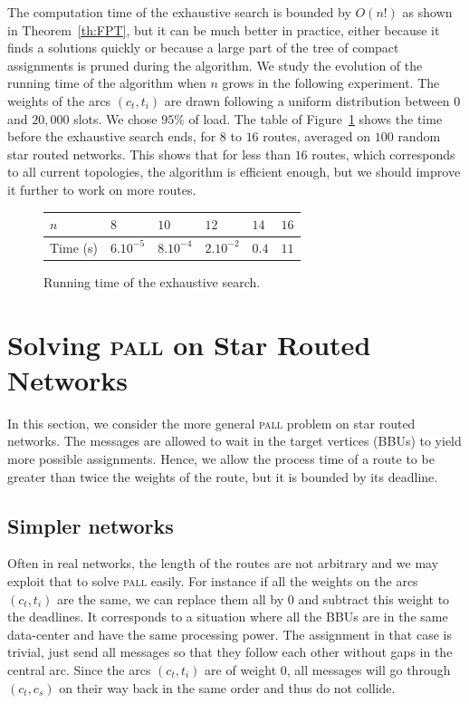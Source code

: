 \documentclass[a4paper,10pt]{article}
\newcommand\pall{\textsc{pall}\xspace}
\begin{document}
      The computation time of the exhaustive search is bounded by $O(n!)$ as shown in Theorem~\ref{th:FPT}, 
      but it can be much better in practice, either because it finds a solutions quickly or because a large part of the tree of 
      compact assignments is pruned during the algorithm. We study the evolution of the running time  of the algorithm when $n$ grows in the following experiment. The weights of the arcs $(c_t,t_i)$ are drawn following a uniform distribution between $0$ and $20,000$ slots. We chose  $95\%$ of load.  The table of Figure~\ref{fig:table} shows the time before the exhaustive search ends, for $8$ to $16$ routes, averaged on $100$ random star routed networks. This shows that for less than $16$ routes, which corresponds to all current topologies, the algorithm is efficient enough, but we should improve it further to work on more routes.
      
      \begin{figure}[h]
         \begin{center}
         \begin{tabularx}{0.5\textwidth}{|l|X|X|X|X|X|}
    \hline
   $n$ & $8$ & $10$& $12$&$14$& $16$\\
    \hline
   Time (s) & $6.10^{-5}$&$8.10^{-4}$&$2.10^{-2}$& $0.4$& $11$\\
    \hline
      \end{tabularx}
      \end{center}
      \caption{Running time of the exhaustive search.}
      \label{fig:table}
      \end{figure}
      
         \section{Solving \pall on Star Routed Networks}\label{sec:PALL}
    
    In this section, we consider the more general \pall problem on star routed networks. The messages are allowed to wait in the target vertices (BBUs) to yield more possible assignments. Hence, we allow the process time of a route to be greater than twice the weights of the route, but it is bounded by its deadline.

	\subsection{Simpler networks}
		
		
	Often in real networks, the length of the routes are not arbitrary and we may exploit that to solve \pall easily. For instance if all the weights on the arcs $(c_t,t_i)$ are the same, we can replace them all by $0$ and subtract this weight to the deadlines. It corresponds to a situation where all the BBUs are in the same data-center and have the same processing power. The assignment in that case is trivial, just send all messages so that they follow each other without gaps in the central arc. Since the arcs $(c_t,t_i)$ are of weight $0$, all messages will go through $(c_t,c_s)$ on their way back in the same order and thus do not collide. 
	
\end{document}
